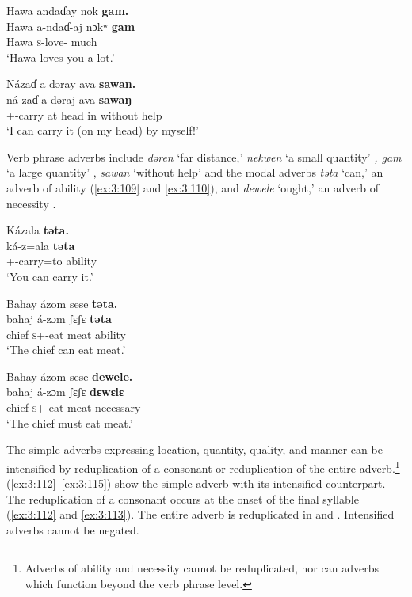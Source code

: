 \ea \label{ex:3:107}
Hawa  andaɗay  nok  \textbf{gam.}\\
\gll  Hawa  a-ndaɗ-aj  nɔkʷ  \textbf{gam}\\
      Hawa    \textsc{s}-love-{\CL}  {\twoS}  much\\
\glt  ‘Hawa loves you a lot.’
\z

\ea \label{ex:3:108}
Názaɗ  a  dəray  ava  \textbf{sawan.}\\
\gll  ná-zaɗ    a  dəraj  ava    \textbf{sawaŋ}\\
      {\oneS}+{\IFV}-carry    at  head  in    {without help}\\
\glt  ‘I can carry it (on my head) by myself!’
\z

Verb phrase adverbs include \textit{dəren} ‘far distance,’ \textit{nekwen} ‘a small quantity’ \textit{, gam }‘a large quantity’ , \textit{sawan} ‘without help’  and the modal adverbs \textit{təta} ‘can,’ an adverb of ability (\ref{ex:3:109} and \ref{ex:3:110}), and \textit{dewele } ‘ought,’ an adverb of necessity . 

\ea \label{ex:3:109}
Kázala  \textbf{təta.}\\
\gll  ká-z=ala    \textbf{təta}\\
      {\twoS}+{\IFV}-carry=to    ability\\
\glt  ‘You can carry it.’
\z

\ea \label{ex:3:110}
Bahay  ázom  sese  \textbf{təta.}\\
\gll  bahaj  á-zɔm    ʃɛʃɛ  \textbf{təta}\\
      chief  \textsc{s}+{\IFV}-eat  meat  ability\\
\glt  ‘The chief can eat meat.’
\z

\ea \label{ex:3:111}
Bahay  ázom  sese  \textbf{dewele.}\\
\gll  bahaj   á-zɔm    ʃɛʃɛ  \textbf{dɛwɛlɛ}\\
      chief  \textsc{s}+{\IFV}-eat  meat  necessary\\
\glt  ‘The chief must eat meat.’
\z

The simple adverbs expressing location, quantity, quality, and manner can be intensified by reduplication of a consonant or reduplication of the entire adverb.\footnote{Adverbs of ability and necessity cannot be reduplicated, nor can adverbs which function beyond the verb phrase level. }  (\ref{ex:3:112}--\ref{ex:3:115}) show the simple adverb with its intensified counterpart. The reduplication of a consonant occurs at the onset of the final syllable (\ref{ex:3:112} and \ref{ex:3:113}). The entire adverb is reduplicated in  and . Intensified adverbs cannot be negated. 

